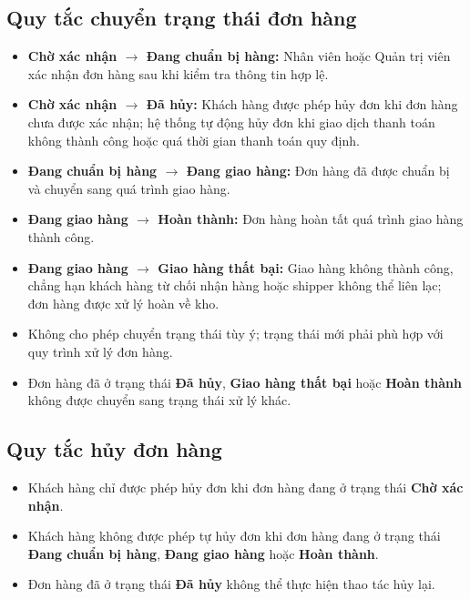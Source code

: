 \documentclass[12pt,a4paper]{article}
\begin{document}
\subsection{Quy tắc chuyển trạng thái đơn hàng}

\begin{itemize}
\item \textbf{Chờ xác nhận $\rightarrow$ Đang chuẩn bị hàng:} Nhân viên hoặc Quản trị viên xác nhận đơn hàng sau khi kiểm tra thông tin hợp lệ.

\item \textbf{Chờ xác nhận $\rightarrow$ Đã hủy:} Khách hàng được phép hủy đơn khi đơn hàng chưa được xác nhận; hệ thống tự động hủy đơn khi giao dịch thanh toán không thành công hoặc quá thời gian thanh toán quy định.

\item \textbf{Đang chuẩn bị hàng $\rightarrow$ Đang giao hàng:} Đơn hàng đã được chuẩn bị và chuyển sang quá trình giao hàng.

\item \textbf{Đang giao hàng $\rightarrow$ Hoàn thành:} Đơn hàng hoàn tất quá trình giao hàng thành công.

\item \textbf{Đang giao hàng $\rightarrow$ Giao hàng thất bại:} Giao hàng không thành công, chẳng hạn khách hàng từ chối nhận hàng hoặc shipper không thể liên lạc; đơn hàng được xử lý hoàn về kho.

\item Không cho phép chuyển trạng thái tùy ý; trạng thái mới phải phù hợp với quy trình xử lý đơn hàng.

\item Đơn hàng đã ở trạng thái \textbf{Đã hủy}, \textbf{Giao hàng thất bại} hoặc \textbf{Hoàn thành} không được chuyển sang trạng thái xử lý khác.
\end{itemize}

\subsection{Quy tắc hủy đơn hàng}
\begin{itemize}
    \item Khách hàng chỉ được phép hủy đơn khi đơn hàng đang ở trạng thái \textbf{Chờ xác nhận}.
    \item Khách hàng không được phép tự hủy đơn khi đơn hàng đang ở trạng thái \textbf{Đang chuẩn bị hàng}, \textbf{Đang giao hàng} hoặc \textbf{Hoàn thành}.
    \item Đơn hàng đã ở trạng thái \textbf{Đã hủy} không thể thực hiện thao tác hủy lại.
\end{itemize}
\end{document}
